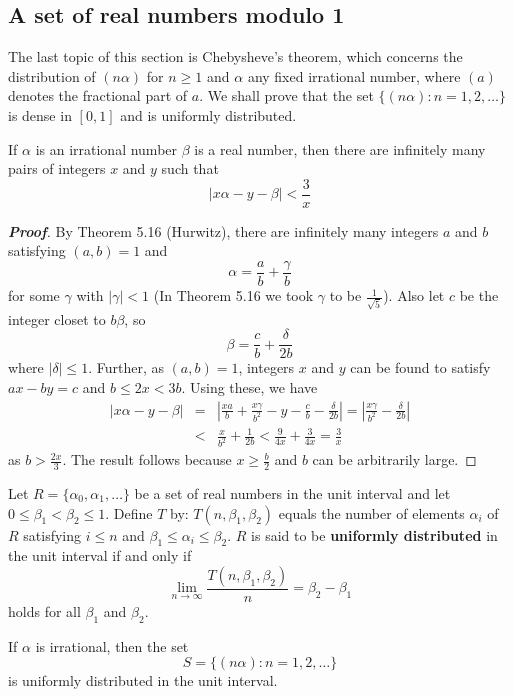 \subsection{A set of real numbers modulo 1}
The last topic of this section is Chebysheve's theorem, which concerns the distribution of
$(n\alpha)$ for $n \ge 1$ and $\alpha$ any fixed irrational number, where $(a)$ denotes the fractional part of $a$.
We shall prove that the set $\{(n\alpha): n=1,2, \ldots\}$ is dense in $[0,1]$ and is uniformly distributed.
\begin{theorem} If $\alpha$ is an irrational number $\beta$ is a real number, then there are infinitely many pairs of integers $x$ and $y$ such that
$$\left|x\alpha-y-\beta\right|<\frac{3}{x}$$
\end{theorem}
\begin{proof}[\bf Proof] By Theorem 5.16 (Hurwitz), there are infinitely many integers $a$ and $b$ satisfying
$(a,b)=1$ and
$$\alpha=\frac{a}{b}+\frac{\gamma}{b}$$
for some $\gamma$ with $|\gamma|<1$ (In Theorem 5.16 we took $\gamma$ to be $\frac{1}{\sqrt{5}}$).
Also let $c$ be the integer closet to $b\beta$, so
$$\beta=\frac{c}{b}+\frac{\delta}{2b}$$
where $|\delta| \le 1$. Further, as $(a,b)=1$, integers $x$ and $y$ can be found to satisfy
$ax-by=c$ and $b \le 2x < 3b$.
Using these, we have
\begin{eqnarray*}
\left|x\alpha-y-\beta\right|&=
&\left|\frac{xa}{b}+\frac{x\gamma}{b^2}-y-\frac{c}{b}-\frac{\delta}{2b}\right| = \left|\frac{x\gamma}{b^2}-\frac{\delta}{2b}\right|\\
&<&\frac{x}{b^2}+\frac{1}{2b} < \frac{9}{4x}+\frac{3}{4x}=\frac{3}{x}
\end{eqnarray*}
as $b>\frac{2x}{3}$. The result follows because $x \ge \frac{b}{2}$ and $b$ can be arbitrarily large.
\end{proof}
\begin{definition} Let $R=\{\alpha_0,\alpha_1,\ldots \}$ be a set of real numbers
in the unit interval and let
$0 \le \beta_1 < \beta_2 \le 1$. Define $T$ by:
$T(n,\beta_1,\beta_2)$ equals the number of elements $\alpha_i$ of $R$ satisfying
$i \le n$ and $\beta_1 \le \alpha_i \le \beta_2$. $R$ is said to be {\bf uniformly distributed} in the unit interval if and only if
$$\lim_{n \to \infty} \frac{T(n,\beta_1,\beta_2)}{n} =\beta_2 -\beta_1$$
holds for all $\beta_1$ and $\beta_2$.
\end{definition}
\begin{theorem} If $\alpha$ is irrational, then the set
$$S=\{(n\alpha):n=1,2,\ldots\}$$ is uniformly distributed in the unit interval.
\end{theorem}
